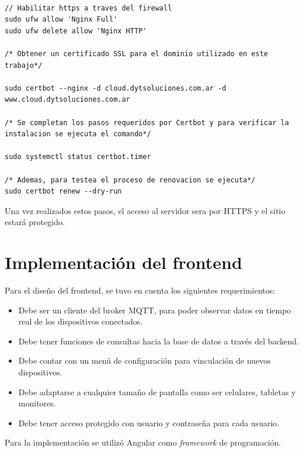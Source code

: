 \begin{lstlisting}[label=cod:certificados-ssl,caption=Procedimiento realizado para instalar certificados SSL en Nginx.] 

// Habilitar https a traves del firewall
sudo ufw allow 'Nginx Full'
sudo ufw delete allow 'Nginx HTTP'

/* Obtener un certificado SSL para el dominio utilizado en este trabajo*/

sudo certbot --nginx -d cloud.dytsoluciones.com.ar -d www.cloud.dytsoluciones.com.ar

/* Se completan los pasos requeridos por Certbot y para verificar la instalacion se ejecuta el comando*/

sudo systemctl status certbot.timer

/* Ademas, para testea el proceso de renovacion se ejecuta*/
sudo certbot renew --dry-run

\end{lstlisting} 

Una vez realizados estos pasos, el acceso al servidor sera por HTTPS y el sitio estará protegido.

\section{Implementación del frontend}

Para el diseño del frontend, se tuvo en cuenta los siguientes requerimientos:

\begin{itemize}
	\item Debe ser un cliente del broker MQTT, para poder observar datos en tiempo real de los dispositivos conectados.
	
	\item Debe tener funciones de consultas hacia la base de datos a través del backend. 
	
	\item Debe contar con un menú de configuración para vinculación de nuevos dispositivos. 
	
	\item Debe adaptarse a cualquier tamaño de pantalla como ser celulares, tabletas y monitores.
	
	\item Debe tener acceso protegido con usuario y contraseña para cada usuario. 

\end{itemize}


Para la implementación se utilizó Angular como \textit{framework} de programación.


